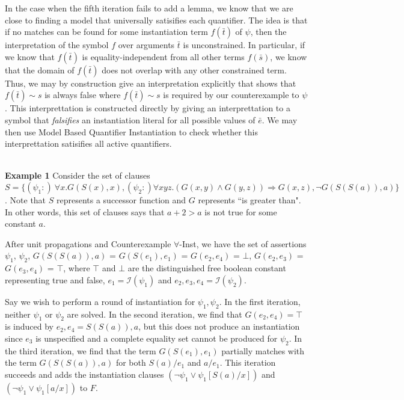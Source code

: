 \documentclass{llncs}
\begin{document}
In the case when the fifth iteration fails to add a lemma, we know that we are close to finding a model that universally satisifies each quantifier.
The idea is that if no matches can be found for some instantiation term $f( \bar{t} )$ of $\psi$, then the interpretation of the symbol $f$ over arguments $\bar{t}$ is unconstrained.
In particular, if we know that $f( \bar{t} )$ is equality-independent from all other terms $f( \bar{ s } )$, we know that the domain of $f( \bar{t} )$ does not overlap with any other constrained term.
Thus, we may by construction give an interpretation explicitly that shows that $f( \bar{ t } ) \sim s$ is always false where $f( \bar{t} ) \sim s$ is required by our counterexample to $\psi$. 
This interprettation is constructed directly by giving an interprettation to a symbol that \emph{falsifies} an instantiation literal for all possible values of $\bar{e}$.
We may then use Model Based Quantifier Instantiation to check whether this interprettation satisifies all active quantifiers.

\ \\

{\bf Example 1}
Consider the set of clauses $S = \{ (\psi_1 :) \ \forall x. G( S( x ), x), (\psi_2 :) \forall xyz. (G(x,y) \wedge G(y,z)) \Rightarrow G(x,z), \neg G( S(S(a)), a) \}$.
Note that $S$ represents a successor function and $G$ represents ``is greater than".  
In other words, this set of clauses says that $a + 2 > a$ is not true for some constant $a$.

After unit propagations and Counterexample $\forall$-Inst, we have the set of assertions $\psi_1$, $\psi_2$, $G( S(S(a)), a)$ = $G( S(e_1), e_1)$ = $G( e_2, e_4 )$ = $\bot$, $G( e_2, e_3 )$ = $G( e_3, e_4 )$ = $\top$, where $\top$ and $\bot$ are the distinguished free boolean constant representing true and false, $e_1 = \mathcal{I}( \psi_1 )$ and $e_2, e_3, e_4 = \mathcal{I}( \psi_2 )$.

Say we wish to perform a round of instantiation for $\psi_1, \psi_2$.
In the first iteration, neither $\psi_1$ or $\psi_2$ are solved.
In the second iteration, we find that $G( e_2, e_4 ) = \top$ is induced by $e_2, e_4 = S(S(a)), a$, but this does not produce an instantiation since $e_3$ is unspecified and a complete equality set cannot be produced for $\psi_2$.
In the third iteration, we find that the term $G( S(e_1), e_1)$ partially matches with the term $G( S(S(a)), a)$ for both $S(a)/e_1$ and $a/e_1$.
This iteration succeeds and adds the instantiation clauses $( \neg \psi_1 \vee \psi_1[S(a)/x])$ and $( \neg \psi_1 \vee \psi_1[a/x])$ to $F$.
\end{document}
